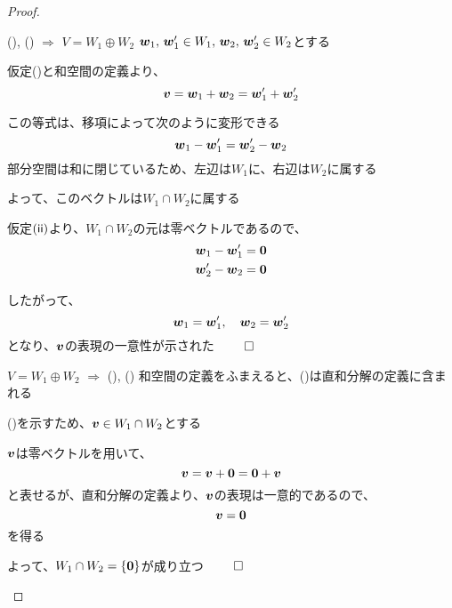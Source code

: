 \documentclass[../../../topic_linear-algebra]{subfiles}
\begin{document}
\begin{proof}
  \begin{subpattern}{(), () $\Longrightarrow$ $V = W_1 \oplus W_2$}
    $\vb*{w}_1,\,\vb*{w}_1' \in W_1, \, \vb*{w}_2,\,\vb*{w}_2' \in W_2$とする

    仮定()と和空間の定義より、
    \begin{equation*}
      \vb*{v} = \vb*{w}_1 + \vb*{w}_2 = \vb*{w}_1' + \vb*{w}_2'
    \end{equation*}

    この等式は、移項によって次のように変形できる
    \begin{equation*}
      \vb*{w}_1 - \vb*{w}_1' = \vb*{w}_2' - \vb*{w}_2
    \end{equation*}
    部分空間は和に閉じているため、左辺は$W_1$に、右辺は$W_2$に属する

    よって、このベクトルは$W_1 \cap W_2$に属する

    仮定$(\textsf{ii})$より、$W_1 \cap W_2$の元は零ベクトルであるので、
    \begin{align*}
      \vb*{w}_1 - \vb*{w}_1' & = \vb*{0} \\
      \vb*{w}_2' - \vb*{w}_2 & = \vb*{0}
    \end{align*}

    したがって、
    \begin{equation*}
      \vb*{w}_1 = \vb*{w}_1', \quad \vb*{w}_2 = \vb*{w}_2'
    \end{equation*}
    となり、$\vb*{v}$の表現の一意性が示された $\qed$
  \end{subpattern}

  \begin{subpattern}{$V = W_1 \oplus W_2$ $\Longrightarrow$ (), ()}
    和空間の定義をふまえると、()は直和分解の定義に含まれる

    \br

    ()を示すため、$\vb*{v} \in W_1 \cap W_2$とする

    $\vb*{v}$は零ベクトルを用いて、
    \begin{equation*}
      \vb*{v} = \vb*{v} + \vb*{0} = \vb*{0} + \vb*{v}
    \end{equation*}
    と表せるが、直和分解の定義より、$\vb*{v}$の表現は一意的であるので、
    \begin{equation*}
      \vb*{v} = \vb*{0}
    \end{equation*}
    を得る

    よって、$W_1 \cap W_2 = \{ \vb*{0} \}$が成り立つ $\qed$
  \end{subpattern}
\end{proof}
\end{document}
